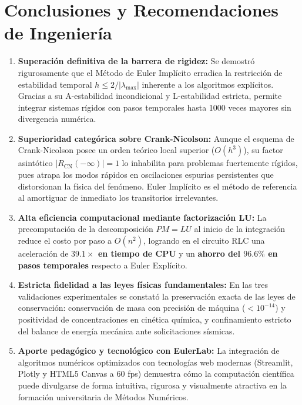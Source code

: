 \documentclass[11pt,a4paper]{article}
\begin{document}
\section{Conclusiones y Recomendaciones de Ingeniería}

\begin{enumerate}
    \item \textbf{Superación definitiva de la barrera de rigidez:} Se demostró rigurosamente que el Método de Euler Implícito erradica la restricción de estabilidad temporal $h \le 2/|\lambda_{\max}|$ inherente a los algoritmos explícitos. Gracias a su A-estabilidad incondicional y L-estabilidad estricta, permite integrar sistemas rígidos con pasos temporales hasta 1000 veces mayores sin divergencia numérica.
    \item \textbf{Superioridad categórica sobre Crank-Nicolson:} Aunque el esquema de Crank-Nicolson posee un orden teórico local superior ($O(h^3)$), su factor asintótico $|R_{\text{CN}}(-\infty)| = 1$ lo inhabilita para problemas fuertemente rígidos, pues atrapa los modos rápidos en oscilaciones espurias persistentes que distorsionan la física del fenómeno. Euler Implícito es el método de referencia al amortiguar de inmediato los transitorios irrelevantes.
    \item \textbf{Alta eficiencia computacional mediante factorización LU:} La precomputación de la descomposición $PM = LU$ al inicio de la integración reduce el costo por paso a $O(n^2)$, logrando en el circuito RLC una aceleración de \textbf{$39.1\times$ en tiempo de CPU} y un \textbf{ahorro del $96.6\%$ en pasos temporales} respecto a Euler Explícito.
    \item \textbf{Estricta fidelidad a las leyes físicas fundamentales:} En las tres validaciones experimentales se constató la preservación exacta de las leyes de conservación: conservación de masa con precisión de máquina ($< 10^{-14}$) y positividad de concentraciones en cinética química, y confinamiento estricto del balance de energía mecánica ante solicitaciones sísmicas.
    \item \textbf{Aporte pedagógico y tecnológico con EulerLab:} La integración de algoritmos numéricos optimizados con tecnologías web modernas (Streamlit, Plotly y HTML5 Canvas a 60 fps) demuestra cómo la computación científica puede divulgarse de forma intuitiva, rigurosa y visualmente atractiva en la formación universitaria de Métodos Numéricos.
\end{enumerate}
\end{document}
